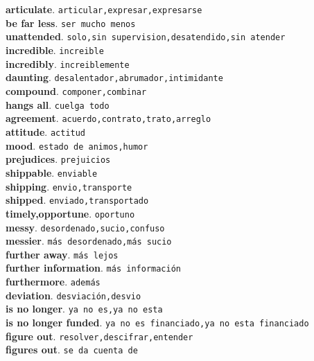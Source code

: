\documentclass[twocolumn]{article}
\begin{document}
	\textsf{\textbf{articulate}}. \texttt{articular,expresar,expresarse}\\
	\textsf{\textbf{be far less}}. \texttt{ser mucho menos}\\
	\textsf{\textbf{unattended}}. \texttt{solo,sin supervision,desatendido,sin atender}\\
	\textsf{\textbf{incredible}}. \texttt{increible}\\
	\textsf{\textbf{incredibly}}. \texttt{increiblemente}\\
	\textsf{\textbf{daunting}}. \texttt{desalentador,abrumador,intimidante}\\
	\textsf{\textbf{compound}}. \texttt{componer,combinar}\\
	\textsf{\textbf{hangs all}}. \texttt{cuelga todo}\\
	\textsf{\textbf{agreement}}. \texttt{acuerdo,contrato,trato,arreglo}\\
	\textsf{\textbf{attitude}}. \texttt{actitud}\\
	\textsf{\textbf{mood}}. \texttt{estado de animos,humor}\\
	\textsf{\textbf{prejudices}}. \texttt{prejuicios}\\
	\textsf{\textbf{shippable}}. \texttt{enviable}\\
	\textsf{\textbf{shipping}}. \texttt{envio,transporte}\\
	\textsf{\textbf{shipped}}. \texttt{enviado,transportado}\\
	\textsf{\textbf{timely,opportune}}. \texttt{oportuno}\\
	\textsf{\textbf{messy}}. \texttt{desordenado,sucio,confuso}\\
	\textsf{\textbf{messier}}. \texttt{m\'as desordenado,m\'as sucio}\\
	\textsf{\textbf{further away}}. \texttt{m\'as lejos}\\
	\textsf{\textbf{further information}}. \texttt{m\'as informaci\'on}\\
	\textsf{\textbf{furthermore}}. \texttt{adem\'as}\\
	\textsf{\textbf{deviation}}. \texttt{desviaci\'on,desvio}\\
	\textsf{\textbf{is no longer}}. \texttt{ya no es,ya no esta}\\
	\textsf{\textbf{is no longer funded}}. \texttt{ya no es financiado,ya no esta financiado}\\
	\textsf{\textbf{figure out}}. \texttt{resolver,descifrar,entender}\\
	\textsf{\textbf{figures out}}. \texttt{se da cuenta de}\\
\end{document}

